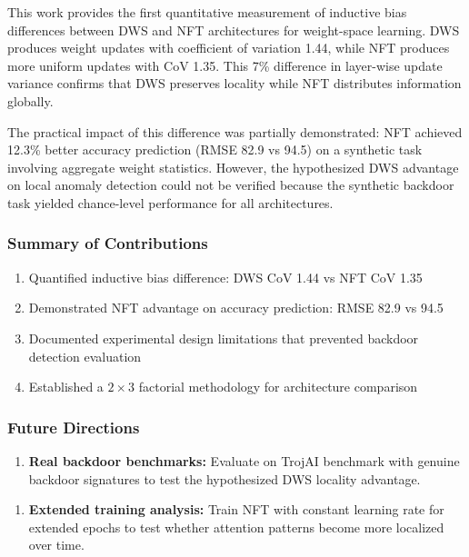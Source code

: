 
This work provides the first quantitative measurement of inductive bias differences between DWS and NFT architectures for weight-space learning. DWS produces weight updates with coefficient of variation 1.44, while NFT produces more uniform updates with CoV 1.35. This 7\% difference in layer-wise update variance confirms that DWS preserves locality while NFT distributes information globally.

The practical impact of this difference was partially demonstrated: NFT achieved 12.3\% better accuracy prediction (RMSE 82.9 vs 94.5) on a synthetic task involving aggregate weight statistics. However, the hypothesized DWS advantage on local anomaly detection could not be verified because the synthetic backdoor task yielded chance-level performance for all architectures.

\subsubsection{Summary of Contributions}

\begin{enumerate}
\item Quantified inductive bias difference: DWS CoV 1.44 vs NFT CoV 1.35
\item Demonstrated NFT advantage on accuracy prediction: RMSE 82.9 vs 94.5
\item Documented experimental design limitations that prevented backdoor detection evaluation
\item Established a $2\times 3$ factorial methodology for architecture comparison
\end{enumerate}

\subsubsection{Future Directions}

\begin{enumerate}
\item \textbf{Real backdoor benchmarks:} Evaluate on TrojAI benchmark with genuine backdoor signatures to test the hypothesized DWS locality advantage.
\end{enumerate}

\begin{enumerate}
\item \textbf{Extended training analysis:} Train NFT with constant learning rate for extended epochs to test whether attention patterns become more localized over time.
\end{enumerate}

